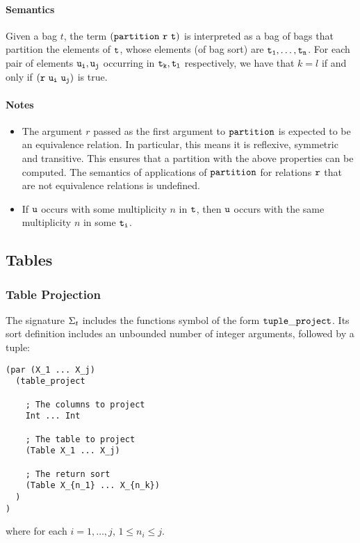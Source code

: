 \documentclass[english,a4paper,10pt]{article}
\begin{document}
\paragraph{Semantics}
Given a bag $t$, 
the term ${\tt (partition\ r\ t)}$ is interpreted
as a bag of bags that partition the elements of ${\tt t}$,
whose elements (of bag sort) are ${\tt t_1}, \ldots, {\tt t_n}$.
For each pair of elements ${\tt u_i}, {\tt u_j}$
occurring in ${\tt t_k}, {\tt t_l}$ respectively,
we have that $k=l$ if and only if ${\tt (r\ u_i\ u_j)}$ is true.

\paragraph{Notes}
\begin{itemize}
\item
The argument $r$ passed as the
first argument to ${\tt partition}$ is expected to be an equivalence relation.
In particular, this means it is reflexive, symmetric and transitive.
This ensures that a partition with the above properties
can be computed.
The semantics of applications of ${\tt partition}$ for relations ${\tt r}$
that are not equivalence relations is undefined.
\item
If ${\tt u}$ occurs with some multiplicity $n$ in ${\tt t}$,
then ${\tt u}$ occurs with the same multiplicity $n$ in some ${\tt t_i}$.
\end{itemize}

\subsection{Tables}

\subsubsection{Table Projection}
The signature $\Sigma_{t}$ includes 
the functions symbol of the form
${\tt tuple\_project}$.
Its sort definition includes an unbounded number of integer arguments, followed
by a tuple:
\begin{verbatim}
(par (X_1 ... X_j) 
  (table_project
  
    ; The columns to project
    Int ... Int
  
    ; The table to project
    (Table X_1 ... X_j)
    
    ; The return sort
    (Table X_{n_1} ... X_{n_k})
  )
)
\end{verbatim}
where for each $i = 1, \ldots, j$,
$1 \leq n_i \leq j$.
\end{document}

